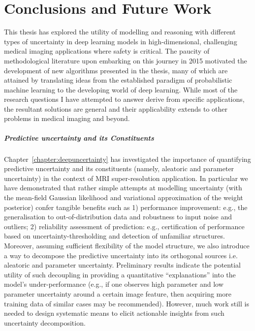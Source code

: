 \chapter{Conclusions and Future Work} \label{chapter:conclusions}

This thesis has explored the utility of modelling and reasoning with different types of uncertainty in deep learning models in high-dimensional, challenging medical imaging applications where safety is critical. The paucity of methodological literature upon embarking on this journey in 2015 motivated the development of new algorithms presented in the thesis, many of which are attained by translating ideas from the established paradigm of probabilistic machine learning to the developing world of deep learning. While most of the research questions I have attempted to answer derive from specific applications, the resultant solutions are general and their applicability extends to other problems in medical imaging and beyond. 

\paragraph{Predictive uncertainty and its Constituents}
Chapter~\ref{chapter:deepuncertainty} has investigated the importance of quantifying predictive uncertainty and its constituents (namely, aleatoric and parameter uncertainty) in the context of MRI super-resolution application. In particular we have demonstrated that rather simple attempts at modelling uncertainty (with the mean-field Gaussian likelihood and variational approximation of the weight posterior) confer tangible benefits such as 1) performance improvement: e.g., the generalisation to out-of-distribution data and robustness to input noise and outliers; 2) reliability assessment of prediction: e.g., certification of performance based on uncertainty-thresholding and detection of unfamiliar structures. Moreover, assuming sufficient flexibility of the model structure, we also introduce a way to decompose the predictive uncertainty into its orthogonal sources i.e. aleatoric and parameter uncertainty. Preliminary results indicate the potential utility of such decoupling in providing a quantitative ``explanations'' into the model's under-performance (e.g., if one observes high parameter and low parameter uncertainty around a certain image feature, then acquiring more training data of similar cases may be recommended). However, much work still is needed to design systematic means to elicit actionable insights from such uncertainty decomposition. 


